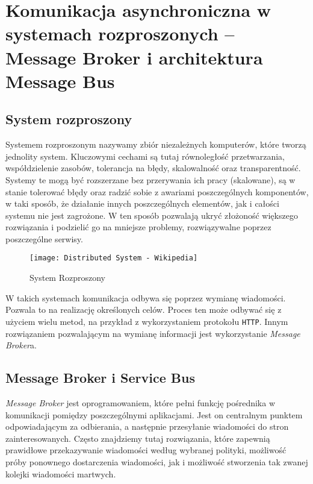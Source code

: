 \section{Komunikacja asynchroniczna w systemach rozproszonych -- Message Broker i architektura Message Bus}

\subsection{System rozproszony}

\par Systemem rozproszonym nazywamy zbiór niezależnych komputerów, które tworzą jednolity system. Kluczowymi cechami są tutaj równoległość przetwarzania, współdzielenie zasobów, tolerancja na błędy, skalowalność oraz transparentność. Systemy te mogą być rozszerzane bez przerywania ich pracy (skalowane), są w stanie tolerować błędy oraz radzić sobie z awariami poszczególnych komponentów, w taki sposób, że działanie innych poszczególnych elementów, jak i całości systemu nie jest zagrożone. W ten sposób pozwalają ukryć złożoność większego rozwiązania i podzielić go na mniejsze problemy, rozwiązywalne poprzez poszczególne serwisy.

\begin{figure}
    \centering
    \texttt{[image: Distributed System - Wikipedia]}
    \caption{System Rozproszony}
    \label{fig:distibutedSystemWikipedia}
\end{figure}

\par W takich systemach komunikacja odbywa się poprzez wymianę wiadomości. Pozwala to na realizację określonych celów. Proces ten może odbywać się z użyciem wielu metod, na przykład z wykorzystaniem protokołu \texttt{HTTP}. Innym rozwiązaniem pozwalającym na wymianę informacji jest wykorzystanie \emph{Message Broker}a.

\subsection{Message Broker i Service Bus}

\par \emph{Message Broker} jest oprogramowaniem, które pełni funkcję pośrednika w komunikacji pomiędzy poszczególnymi aplikacjami. Jest on centralnym punktem odpowiadającym za odbierania, a następnie przesyłanie wiadomości do stron zainteresowanych. Często znajdziemy tutaj rozwiązania, które zapewnią prawidłowe przekazywanie wiadomości według wybranej polityki, możliwość próby ponownego dostarczenia wiadomości, jak i możliwość stworzenia tak zwanej kolejki wiadomości martwych.

